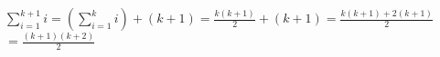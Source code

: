 \documentclass[preview]{standalone}
\begin{document}
\begin{center}
$\sum_{i=1}^{k+1} i = \left( \sum_{i=1}^{k} i \right) + (k+1)$$= \frac{k(k+1)}{2} + (k+1)$$= \frac{k(k+1) + 2(k+1)}{2}$$= \frac{(k+1)(k+2)}{2}$
\end{center}
\end{document}
